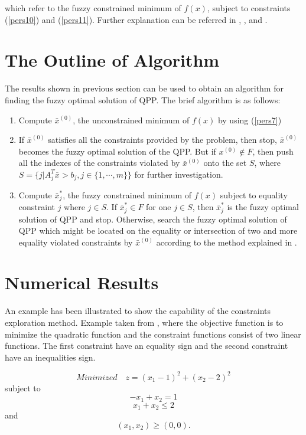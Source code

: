 \documentclass{iaesarticle3}
\begin{document}
which refer to the fuzzy constrained minimum of $f(x)$, subject to constraints (\ref{pers10}) and (\ref{pers11}). Further explanation can be referred in \cite{ism}, \cite{iby}, and \cite{isy}.

\section{The Outline of Algorithm}

The results shown in previous section can be used to obtain an algorithm for finding the fuzzy optimal solution of QPP. The brief algorithm is as follows:
\begin{enumerate}
  \item Compute $\bar{x}^{(0)}$, the unconstrained minimum of $f(x)$ by using (\ref{pers7})
  \item If $\bar{x}^{(0)}$ satisfies all the constraints provided by the problem, then stop, $\bar{x}^{(0)}$ becomes the fuzzy optimal solution of the QPP. But if $x^{(0)} \notin F$, then push all the indexes of the constraints violated by $\bar{x}^{(0)}$ onto the set $S$, where $S = \{j|A_j^T\bar{x} > b_j, j \in \{1, \cdots, m\}\}$ for further investigation.
  \item Compute $\bar{x}_j^*$, the fuzzy constrained minimum of $f(x)$ subject to equality constraint $j$ where $j \in S$. If $\bar{x}_j^* \in F$ for one $j \in S$, then $\bar{x}_j^*$ is the fuzzy optimal solution of QPP and stop. Otherwise, search the fuzzy optimal solution of QPP which might be located on the equality or intersection of two and more equality violated constraints by $\bar{x}^{(0)}$ according to the method explained in \cite{ism,iby, isy}.
\end{enumerate}

\section{Numerical Results}

An example has been illustrated to show the capability of the constraints exploration method. Example taken from \cite{dav}, where the objective function is to minimize the quadratic function and the constraint functions consist of two linear functions. The first constraint have an equality sign and the second constraint have an inequalities sign.

\begin{equation}\label{pers20}
    Minimized \quad z = (x_1 - 1)^2 + (x_2 - 2)^2
\end {equation}
\noindent
subject to
\begin{equation}\label{pers21}
    -x_1 + x_2 = 1
\end{equation}
\begin{equation}\label{pers22}
    x_1 + x_2 \leq 2
\end{equation}
\noindent
and
\begin{equation}\label{pers23}
    (x_1, x_2) \geq (0, 0).
\end{equation}
\end{document}
